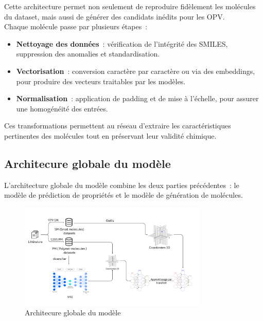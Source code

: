 Cette architecture permet non seulement de reproduire fidèlement les molécules du
dataset, mais aussi de générer des candidats inédits pour les OPV. \\

Chaque molécule passe par plusieurs étapes :

\begin{itemize}
    \item \textbf{Nettoyage des données} : vérification de l'intégrité des SMILES, suppression des anomalies et standardisation.
    \item \textbf{Vectorisation} : conversion caractère par caractère ou via des embeddings, pour produire des vecteurs traitables par les modèles.
    \item \textbf{Normalisation} : application de padding et de mise à l'échelle, pour assurer une homogénéité des entrées.
\end{itemize}

Ces transformations permettent au réseau d'extraire les caractéristiques pertinentes des molécules tout en préservant leur validité chimique.

\subsection{Architecure globale du modèle}

L'architecture globale du modèle combine les deux parties précédentes : le
modèle de prédiction de propriétés et le modèle de génération de molécules.

\begin{figure}[H]
    \centering
    \includegraphics[width=0.8\textwidth]{Architecture/global.png}
    \caption{Architecure globale du modèle}
\end{figure}

